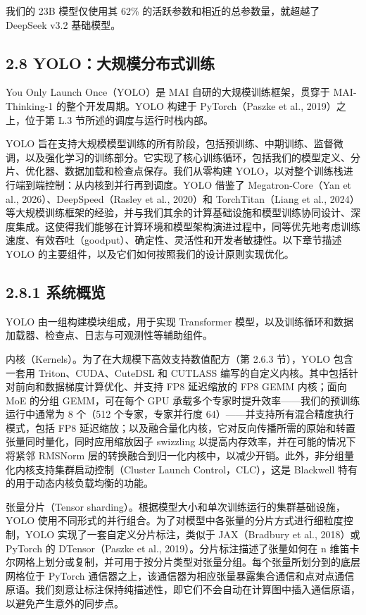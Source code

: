 我们的 23B 模型仅使用其 62\% 的活跃参数和相近的总参数量，就超越了 DeepSeek v3.2 基础模型。

\subsection{2.8 YOLO：大规模分布式训练}\label{yolo-distributed-training-at-scale}

You Only Launch Once（YOLO）是 MAI 自研的大规模训练框架，贯穿于 MAI-Thinking-1 的整个开发周期。YOLO 构建于 PyTorch（Paszke et al., 2019）之上，位于第 L.3 节所述的调度与运行时栈内部。

YOLO 旨在支持大规模模型训练的所有阶段，包括预训练、中期训练、监督微调，以及强化学习的训练部分。它实现了核心训练循环，包括我们的模型定义、分片、优化器、数据加载和检查点保存。我们从零构建 YOLO，以对整个训练栈进行端到端控制：从内核到并行再到调度。YOLO 借鉴了 Megatron-Core（Yan et al., 2026）、DeepSpeed（Rasley et al., 2020）和 TorchTitan（Liang et al., 2024）等大规模训练框架的经验，并与我们其余的计算基础设施和模型训练协同设计、深度集成。这使得我们能够在计算环境和模型架构演进过程中，同等优先地考虑训练速度、有效吞吐（goodput）、确定性、灵活性和开发者敏捷性。以下章节描述 YOLO 的主要组件，以及它们如何按照我们的设计原则实现优化。



\subsection{2.8.1 系统概览}\label{system-overview}

YOLO 由一组构建模块组成，用于实现 Transformer 模型，以及训练循环和数据加载器、检查点、日志与可观测性等辅助组件。

内核（Kernels）。为了在大规模下高效支持数值配方（第 2.6.3 节），YOLO 包含一套用 Triton、CUDA、CuteDSL 和 CUTLASS 编写的自定义内核。其中包括针对前向和数据梯度计算优化、并支持 FP8 延迟缩放的 FP8 GEMM 内核；面向 MoE 的分组 GEMM，可在每个 GPU 承载多个专家时提升效率——我们的预训练运行中通常为 8 个（512 个专家，专家并行度 64）——并支持所有混合精度执行模式，包括 FP8 延迟缩放；以及融合量化内核，它对反向传播所需的原始和转置张量同时量化，同时应用缩放因子 swizzling 以提高内存效率，并在可能的情况下将紧邻 RMSNorm 层的转换融合到归一化内核中，以减少开销。此外，非分组量化内核支持集群启动控制（Cluster Launch Control，CLC），这是 Blackwell 特有的用于动态内核负载均衡的功能。

张量分片（Tensor sharding）。根据模型大小和单次训练运行的集群基础设施，YOLO 使用不同形式的并行组合。为了对模型中各张量的分片方式进行细粒度控制，YOLO 实现了一套自定义分片标注，类似于 JAX（Bradbury et al., 2018）或 PyTorch 的 DTensor（Paszke et al., 2019）。分片标注描述了张量如何在 n 维笛卡尔网格上划分或复制，并可用于按分片类型对张量分组。每个张量所划分到的底层网格位于 PyTorch 通信器之上，该通信器为相应张量暴露集合通信和点对点通信原语。我们刻意让标注保持纯描述性，即它们不会自动在计算图中插入通信原语，以避免产生意外的同步点。

